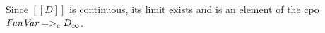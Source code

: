 \documentclass[preprint,nocopyrightspace]{sigplanconf}
\begin{document}
Since $[\![D]\!]$ is continuous, its limit exists and is an element of the cpo $\textit{FunVar} =>_c D_{\infty}$.




 
\end{document}
